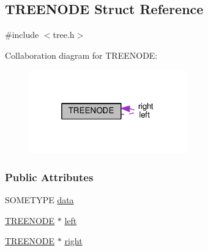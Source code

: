 \hypertarget{structTREENODE}{\subsection{T\+R\+E\+E\+N\+O\+D\+E Struct Reference}
\label{structTREENODE}
}


{\ttfamily \#include $<$tree.\+h$>$}



Collaboration diagram for T\+R\+E\+E\+N\+O\+D\+E\+:\nopagebreak
\begin{figure}[H]
\begin{center}
\leavevmode
\includegraphics[width=193pt]{structTREENODE__coll__graph}
\end{center}
\end{figure}
\subsubsection*{Public Attributes}
\begin{DoxyCompactItemize}
\item 
S\+O\+M\+E\+T\+Y\+P\+E \hyperlink{structTREENODE_a16ae670d55c94f5358ae792a513e1e3c}{data}
\item 
\hyperlink{structTREENODE}{T\+R\+E\+E\+N\+O\+D\+E} $\ast$ \hyperlink{structTREENODE_a410b5b4e739703d7604d2bc7c5eddda9}{left}
\item 
\hyperlink{structTREENODE}{T\+R\+E\+E\+N\+O\+D\+E} $\ast$ \hyperlink{structTREENODE_a8b5bca93407a19121eefe5e0f08c4307}{right}
\end{DoxyCompactItemize}


